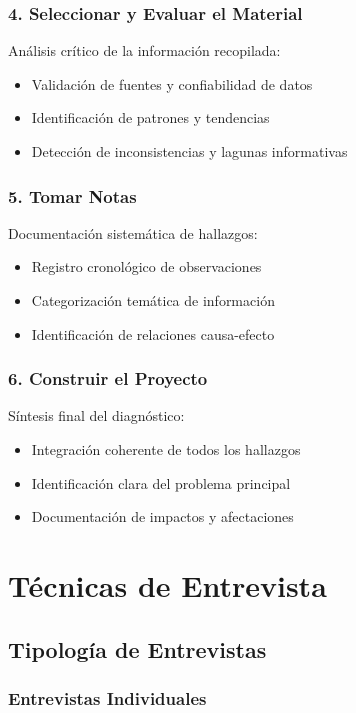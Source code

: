 \documentclass[12pt,letterpaper,oneside]{book}
\begin{document}
\subsubsection{4. Seleccionar y Evaluar el Material}

Análisis crítico de la información recopilada:
\begin{itemize}
\item Validación de fuentes y confiabilidad de datos
\item Identificación de patrones y tendencias
\item Detección de inconsistencias y lagunas informativas
\end{itemize}

\subsubsection{5. Tomar Notas}

Documentación sistemática de hallazgos:
\begin{itemize}
\item Registro cronológico de observaciones
\item Categorización temática de información
\item Identificación de relaciones causa-efecto
\end{itemize}

\subsubsection{6. Construir el Proyecto}

Síntesis final del diagnóstico:
\begin{itemize}
\item Integración coherente de todos los hallazgos
\item Identificación clara del problema principal
\item Documentación de impactos y afectaciones
\end{itemize}

\section{Técnicas de Entrevista}

\subsection{Tipología de Entrevistas}

\subsubsection{Entrevistas Individuales}
\end{document}
